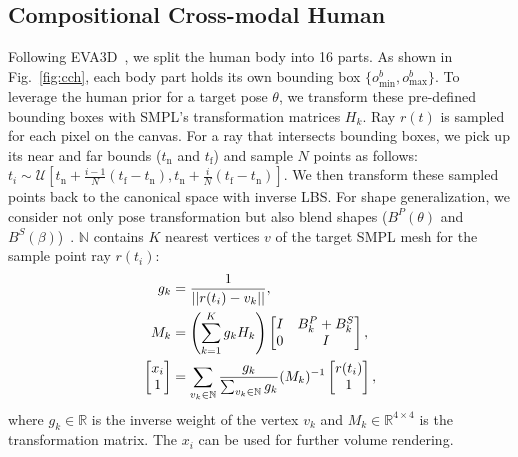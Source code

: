 \documentclass[11pt]{article}
\begin{document}
\subsection{Compositional Cross-modal Human}
Following EVA3D~\cite{hong2023eva3d}, we split the human body into 16 parts. As shown in Fig.~\ref{fig:cch}, each body part holds its own bounding box $\{o^b_{\text{min}}, o^b_{\text{max}}\}$. To leverage the human prior for a target pose $\theta$, we transform these pre-defined bounding boxes with SMPL's transformation matrices $H_k$. Ray $r(t)$ is sampled for each pixel on the canvas. For a ray that intersects bounding boxes, we pick up its near and far bounds ($t_\text{n}$ and $t_\text{f}$) and sample $N$ points as follows: $t_i \sim \mathcal{U}\left[t_\text{n}+\frac{i-1}{N}(t_\text{f}-t_\text{n}), t_\text{n}+\frac{i}{N}(t_\text{f}-t_\text{n})\right]$. We then transform these sampled points back to the canonical space with inverse LBS. For shape generalization, we consider not only pose transformation but also blend shapes ($B^P(\theta)$ and $B^S(\beta)$)~\cite{zheng2021pamir}. $\mathbb{N}$ contains $K$ nearest vertices $v$ of the target SMPL mesh for the sample point ray $r(t_i)$:
\begin{align}
    g_k &= \frac{1}{||r(t_i)-v_k||}, \notag \\
    M_k &= \left(\sum_{k=1}^{K}g_kH_k\right) \begin{bmatrix} I & B^P_k+B^S_k \\ 0 & I \end{bmatrix}, \notag \\
    \begin{bmatrix} x_i \\ 1 \end{bmatrix} &= \sum_{v_k \in \mathbb{N}}\frac{g_k}{\sum_{v_k \in \mathbb{N}} g_k}(M_k)^{-1} \begin{bmatrix} r(t_i) \\ 1 \end{bmatrix}, \label{eq:inverse-lbs}
\end{align}
where $g_k \in \mathbb{R}$ is the inverse weight of the vertex $v_k$ and $M_k \in \mathbb{R}^{4 \times 4}$ is the transformation matrix. The $x_i$ can be used for further volume rendering.
\end{document}
